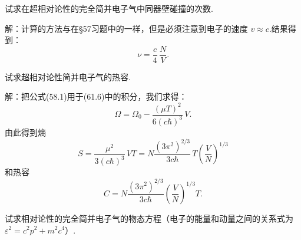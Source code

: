 \begin{xiti}

\quad 试求在超相对论性的完全简并电子气中同器壁碰撞的次数.

解：计算的方法与在§57习题中的一样，但是必须注意到电子的速度 $v\approx c$.结果得到：
\begin{equation*}
  \nu=\frac{c}{4}\,\frac{N}{V}.
\end{equation*}

\quad 试求超相对论性简并电子气的热容.

解：把公式(58.1)用于(61.6)中的积分，我们求得：
\begin{equation*}
  \Omega=\Omega_0-\frac{(\mu T)^2}{6(c\hbar)^3}\,V.
\end{equation*}
由此得到熵
\begin{equation*}
  S=\frac{\mu^2}{3(c\hbar)^3}\,VT
  =N\frac{\left(3\pi^2\right)^{2/3}}{3c\hbar}\,T\left(\frac{V}{N}\right)^{1/3}
\end{equation*}
和热容
\begin{equation*}
  C=N\frac{\left(3\pi^2\right)^{2/3}}{3c\hbar}
  \left(\frac{V}{N}\right)^{1/3}T.
\end{equation*}

\quad 试求相对论性的完全简并电子气的物态方程（电子的能量和动量之间的关系式为 $\varepsilon^2=c^2p^2+m^2c^4$）.


\end{xiti}
